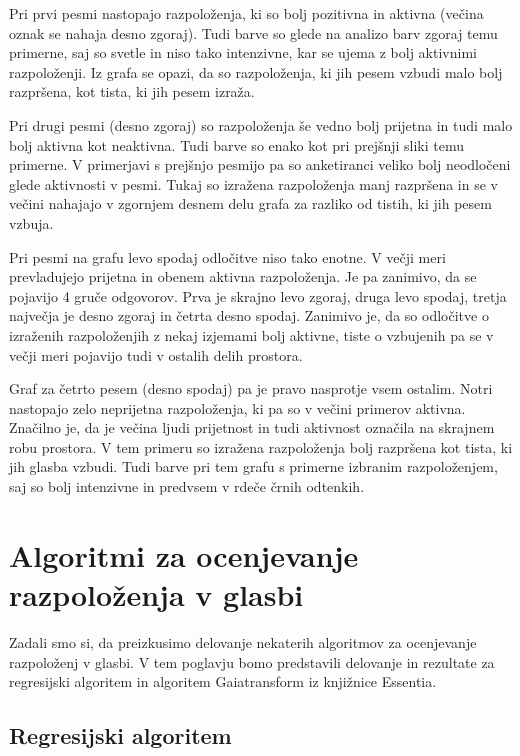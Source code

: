 \documentclass[a4paper, 12pt]{book}
\begin{document}
{Pri prvi pesmi nastopajo razpoloženja, ki so bolj pozitivna in aktivna (večina oznak se nahaja desno zgoraj). Tudi barve so glede na analizo barv zgoraj temu primerne, saj so svetle in niso tako intenzivne, kar se ujema z bolj aktivnimi razpoloženji. Iz grafa se opazi, da so razpoloženja, ki jih pesem vzbudi malo bolj razpršena, kot tista, ki jih pesem izraža.

Pri drugi pesmi (desno zgoraj) so razpoloženja še vedno bolj prijetna in tudi malo bolj aktivna kot neaktivna. Tudi barve so enako kot pri prejšnji sliki temu primerne. V primerjavi s prejšnjo pesmijo pa so anketiranci veliko bolj neodločeni glede aktivnosti v pesmi. Tukaj so izražena razpoloženja manj razpršena in se v večini nahajajo v zgornjem desnem delu grafa za razliko od tistih, ki jih pesem vzbuja. 

Pri pesmi na grafu levo spodaj odločitve niso tako enotne. V večji meri prevladujejo prijetna in obenem aktivna razpoloženja. Je pa zanimivo, da se pojavijo 4 gruče odgovorov. Prva je skrajno levo zgoraj, druga levo spodaj, tretja največja je desno zgoraj in četrta desno spodaj. Zanimivo je, da so odločitve o izraženih razpoloženjih z nekaj izjemami bolj aktivne, tiste o vzbujenih pa se v večji meri pojavijo tudi v ostalih delih prostora. 

Graf za četrto pesem (desno spodaj) pa je pravo nasprotje vsem ostalim. Notri nastopajo zelo neprijetna razpoloženja, ki pa so v večini primerov aktivna. Značilno je, da je večina ljudi prijetnost in tudi aktivnost označila na skrajnem robu prostora. V tem primeru so izražena razpoloženja bolj razpršena kot tista, ki jih glasba vzbudi. Tudi barve pri tem grafu s primerne izbranim razpoloženjem, saj so bolj intenzivne in predvsem v rdeče črnih odtenkih. 

\chapter{Algoritmi za ocenjevanje razpoloženja v glasbi}

Zadali smo si, da preizkusimo delovanje nekaterih algoritmov za ocenjevanje razpoloženj v glasbi. V tem poglavju bomo predstavili delovanje in rezultate za regresijski algoritem in algoritem Gaiatransform iz knjižnice Essentia.

\section{Regresijski algoritem}

}
\end{document}
